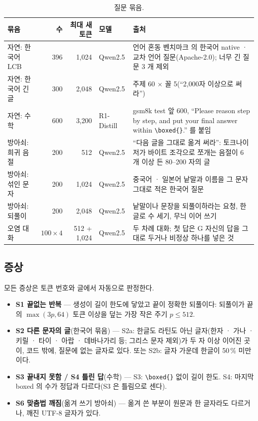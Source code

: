 \documentclass[11pt]{article}
\begin{document}
\begin{table}[t]
\centering
\small
\caption{질문 묶음.}
\label{tab:sets}
\begin{tabularx}{\textwidth}{@{}l r r l Y@{}}
\toprule
묶음 & 수 & 최대 새 토큰 & 모델 & 출처 \\
\midrule
자연: 한국어 LCB & 396 & 1,024 & Qwen2.5 & 언어 혼동 벤치마크 \citep{marchisio2024a} 의 한국어 native · 교차 언어
  질문(Apache-2.0); 너무 긴 질문 3 개 제외 \\
자연: 한국어 긴 글 & 300 & 2,048 & Qwen2.5 & 주제 60 $\times$ 꼴 5(``2,000자 이상으로 써라'') \\
자연: 수학 & 600 & 3,200 & R1-Distill & gsm8k test \citep{cobbe2021} 앞 600, ``Please reason step by step, and put your final
  answer within \texttt{\textbackslash boxed\{\}}.'' 를 붙임 \\
방아쇠: 희귀 음절 & 200 & 512 & Qwen2.5 & ``다음 글을 그대로 옮겨 써라'': 토크나이저가 바이트 조각으로 쪼개는 음절이 6 개 이상 든
  80--200 자의 글 \\
방아쇠: 섞인 문자 & 200 & 1,024 & Qwen2.5 & 중국어 · 일본어 낱말과 이름을 그 문자 그대로 적은 한국어 질문 \\
방아쇠: 되풀이 & 200 & 2,048 & Qwen2.5 & 낱말이나 문장을 되풀이하라는 요청, 한글로 수 세기, 무늬 이어 쓰기 \\
오염 대화 & $100\times4$ & 512 + 1,024 & Qwen2.5 & 두 차례 대화; 첫 답은 G 자신의 답을 그대로 두거나 비정상 하나를 넣은 것 \\
\bottomrule
\end{tabularx}
\end{table}

\subsection{증상}\label{sec:symptoms}

모든 증상은 토큰 번호와 글에서 자동으로 판정한다.
\begin{itemize}
\item \textbf{S1 끝없는 반복} --- 생성이 길이 한도에 닿았고 끝이 정확한 되풀이다: 되풀이가 끝의 $\max(3p, 64)$ 토큰 이상을 덮는
      가장 작은 주기 $p\le 512$.
\item \textbf{S2 다른 문자의 글}(한국어 묶음) --- S2a: 한글도 라틴도 아닌 글자(한자 · 가나 · 키릴 · 타이 · 아랍 · 데바나가리 등;
      그리스 문자 제외)가 두 자 이상 이어진 곳이, 코드 밖에, 질문에 없는 글자로 있다. 또는 S2b: 글자 가운데 한글이 50\,\%
      미만이다.
\item \textbf{S3 끝내지 못함 / S4 틀린 답}(수학) --- S3: \texttt{\textbackslash boxed\{\}} 없이 길이 한도. S4: 마지막 boxed 의
      수가 정답과 다르다(S3 은 틀림으로 센다).
\item \textbf{S6 맞춤법 깨짐}(옮겨 쓰기 방아쇠) --- 옮겨 쓴 부분이 원문과 한 글자라도 다르거나, 깨진 UTF-8 글자가 있다.
\end{itemize}
\end{document}
